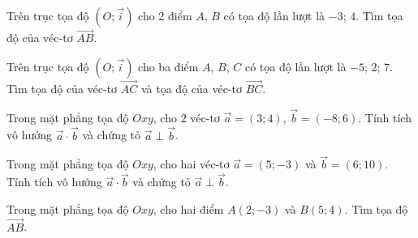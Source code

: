 \begin{bt}%
	Trên trục tọa độ $\left(O;\overrightarrow{i}\right)$ cho 2 điểm $A$, $B$ có tọa độ lần lượt là $-3$; $4$. Tìm tọa độ của véc-tơ $\overrightarrow{AB}$.
\end{bt}

\begin{bt}%
	Trên trục tọa độ $\left(O;\overrightarrow{i}\right)$ cho ba điểm $A$, $B$, $C$ có tọa độ lần lượt là $-5$; $2$; $7$. Tìm tọa độ của véc-tơ $\overrightarrow{AC}$ và tọa độ của véc-tơ $\overrightarrow{BC}$.
\end{bt}

\begin{bt}%
Trong mặt phẳng tọa độ $Oxy$, cho $2$ véc-tơ $\overrightarrow{a}=(3;4)$, $\overrightarrow{b}=(-8;6)$. Tính tích vô hướng $\overrightarrow{a}\cdot \overrightarrow{b}$ và chứng tỏ $\overrightarrow{a}\perp\overrightarrow{b}$.
\end{bt}

\begin{bt}%
	Trong mặt phẳng tọa độ $Oxy$, cho hai véc-tơ $\overrightarrow{a}=(5;-3)$ và $\overrightarrow{b}=(6;10)$. Tính tích vô hướng $\overrightarrow{a}\cdot \overrightarrow{b}$ và chứng tỏ $\overrightarrow{a}\perp\overrightarrow{b}$.
\end{bt}

\begin{bt}%
Trong mặt phẳng tọa độ $Oxy$, cho hai điểm $A(2; -3)$ và $B(5; 4)$. Tìm tọa độ $\overrightarrow{AB}$.
\end{bt}

